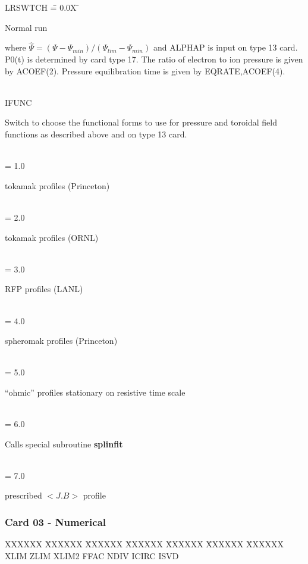 \begin{tabbing} 
LRSWTCH \= = 0.0X \= \parbox[t]{\width}{ Normal run } \kill 
\>       \> \parbox[t]{\width}{ where $\hat{\Psi} = (\Psi - \Psi_{min})/(\Psi_{lim}-\Psi_{min})$
and ALPHAP is input on type 13 card.  P0(t) is determined by card type 17. The ratio of electron to
ion pressure is given by ACOEF(2).  Pressure equilibration time is given by
EQRATE,ACOEF(4). } \\ 
IFUNC \>      \> \parbox[t]{\width}{ Switch to choose the functional forms to use for pressure
and toroidal field functions as described above and on type 13 card.} \\ 
      \> = 1.0 \> \parbox[t]{\width}{ tokamak profiles (Princeton)} \\ 
      \> = 2.0 \> \parbox[t]{\width}{ tokamak profiles (ORNL)} \\ 
      \> = 3.0 \> \parbox[t]{\width}{ RFP profiles (LANL)} \\ 
      \> = 4.0 \> \parbox[t]{\width}{ spheromak profiles (Princeton)} \\ 
      \> = 5.0 \> \parbox[t]{\width}{ ``ohmic'' profiles stationary on
      resistive time scale}\\
     \> = 6.0 \> \parbox[t]{\width}{Calls special subroutine {\bf splinfit}} \\
     \> = 7.0 \> \parbox[t]{\width}{prescribed $<J . B>$ profile}
\end{tabbing}
\newpage \subsubsection{Card 03 - Numerical} 
\begin{tabbing} 
XXXXXX \= XXXXXX \= XXXXXX \= XXXXXX \= XXXXXX \= XXXXXX \=
XXXXXX        \\ 
\footnotesize XLIM \>\footnotesize ZLIM \>\footnotesize XLIM2 \>\footnotesize FFAC
\>\footnotesize NDIV \>\footnotesize ICIRC \>\footnotesize ISVD 
\end{tabbing}
